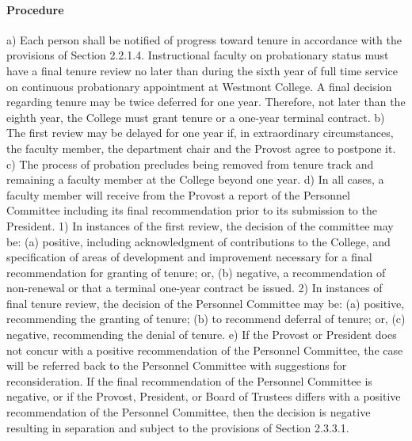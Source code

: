 \documentclass[letterpaper, 11pt]{article}
\begin{document}
			\paragraph{Procedure}
				a) Each person shall be notified of progress toward tenure in accordance with the provisions of Section 2.2.1.4.  Instructional faculty on probationary status must have a final tenure review no later than during the sixth year of full time service on continuous probationary appointment at Westmont College.  A final decision regarding tenure may be twice deferred for one year.  Therefore, not later than the eighth year, the College must grant tenure or a one-year terminal contract.
				b) The first review may be delayed for one year if, in extraordinary circumstances, the faculty member, the department chair and the Provost agree to postpone it.
				c) The process of probation precludes being removed from tenure track and remaining a faculty member at the College beyond one year.
				d) In all cases, a faculty member will receive from the Provost a report of the Personnel Committee including its final recommendation prior to its submission to the President.
				1) In instances of the first review, the decision of the committee may be:
				(a) positive, including acknowledgment of contributions to the College, and specification of areas of development and improvement necessary for a final recommendation for granting of tenure; or,
				(b) negative, a recommendation of non-renewal or that a terminal one-year contract be issued.
				2) In instances of final tenure review, the decision of the Personnel Committee may be:
				(a) positive, recommending the granting of tenure;
				(b) to recommend deferral of tenure; or,
				(c) negative, recommending the denial of tenure.
				e) If the Provost or President does not concur with a positive recommendation of the Personnel Committee, the case will be referred back to the Personnel Committee with suggestions for reconsideration.  If the final recommendation of the Personnel Committee is negative, or if the Provost, President, or Board of Trustees differs with a positive recommendation of the Personnel Committee, then the decision is negative resulting in separation and subject to the provisions of Section 2.3.3.1.
\end{document}
